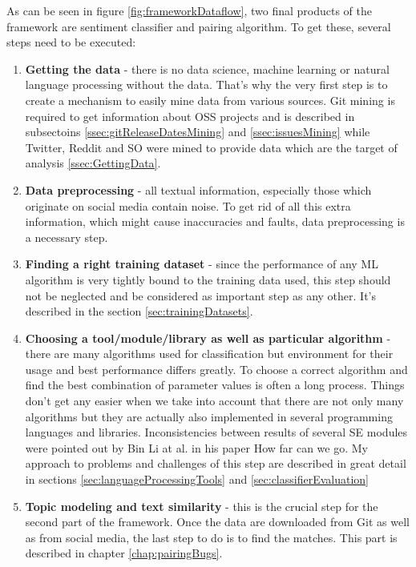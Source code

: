 As can be seen in figure \ref{fig:frameworkDataflow}, two final products of the framework are sentiment classifier and pairing algorithm. To get these, several steps need to be executed:
\begin{enumerate}
\item{\textbf{Getting the data} - there is no data science, machine learning or natural language processing without the data. That's why the very first step is to create a mechanism to easily mine data from various sources. Git mining is required to get information about OSS projects and is described in subsectoins \ref{ssec:gitReleaseDatesMining} and \ref{ssec:issuesMining} while Twitter, Reddit and SO were mined to provide data which are the target of analysis \ref{ssec:GettingData}.}
\item{\textbf{Data preprocessing} - all textual information, especially those which originate on social media contain noise. To get rid of all this extra information, which might cause inaccuracies and faults, data preprocessing is a necessary step.}
\item{\textbf{Finding a right training dataset} - since the performance of any ML algorithm is very tightly bound to the training data used, this step should not be neglected and be considered as important step as any other. It's described in the section \ref{sec:trainingDatasets}.}
\item{\textbf{Choosing a tool/module/library as well as particular algorithm} - there are many algorithms used for classification but environment for their usage and best performance differs greatly. To choose a correct algorithm and find the best combination of parameter values is often a long process. Things don't get any easier when we take into account that there are not only many algorithms but they are actually also implemented in several programming languages and libraries. Inconsistencies between results of several SE modules were pointed out by Bin Li at al. in his paper How far can we go. My approach to problems and challenges of this step are described in great detail in sections \ref{sec:languageProcessingTools} and \ref{sec:classifierEvaluation}}
\item{\textbf{Topic modeling and text similarity} - this is the crucial step for the second part of the framework. Once the data are downloaded from Git as well as from social media, the last step to do is to find the matches.   This part is described in chapter \ref{chap:pairingBugs}.}
\end{enumerate}

